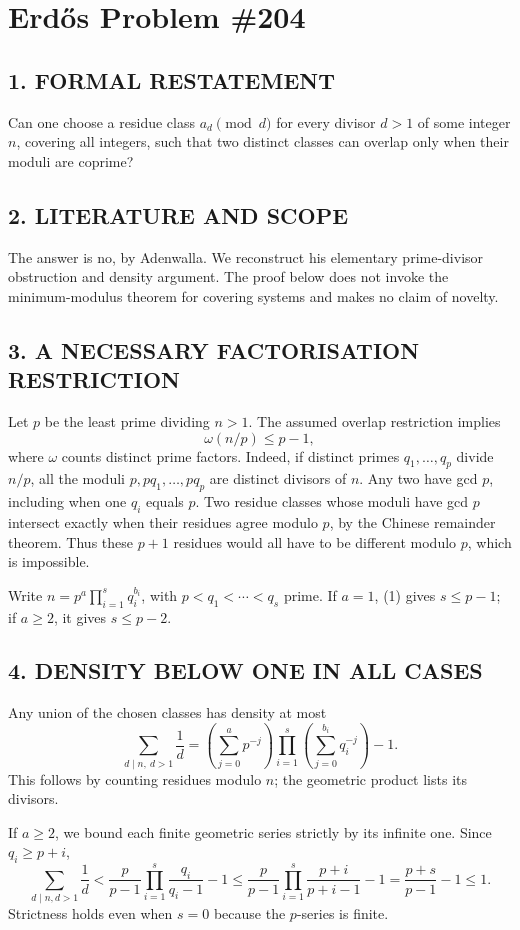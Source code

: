 \section{Erd\H{o}s Problem \#204}
\subsection*{1. FORMAL RESTATEMENT}
Can one choose a residue class $a_d\pmod d$ for every divisor $d>1$ of some integer $n$, covering all integers, such that two distinct classes can overlap only when their moduli are coprime?
\subsection*{2. LITERATURE AND SCOPE}
The answer is no, by Adenwalla. We reconstruct his elementary prime-divisor obstruction and density argument. The proof below does not invoke the minimum-modulus theorem for covering systems and makes no claim of novelty.
\subsection*{3. A NECESSARY FACTORISATION RESTRICTION}
Let $p$ be the least prime dividing $n>1$. The assumed overlap restriction implies
\[
 \omega(n/p)\le p-1,                                      \tag{1}
\]
where $\omega$ counts distinct prime factors. Indeed, if distinct primes $q_1,\ldots,q_p$ divide $n/p$, all the moduli $p,pq_1,\ldots,pq_p$ are distinct divisors of $n$. Any two have gcd $p$, including when one $q_i$ equals $p$. Two residue classes whose moduli have gcd $p$ intersect exactly when their residues agree modulo $p$, by the Chinese remainder theorem. Thus these $p+1$ residues would all have to be different modulo $p$, which is impossible.

Write $n=p^a\prod_{i=1}^s q_i^{b_i}$, with $p<q_1<\cdots<q_s$ prime. If $a=1$, (1) gives $s\le p-1$; if $a\ge2$, it gives $s\le p-2$.
\subsection*{4. DENSITY BELOW ONE IN ALL CASES}
Any union of the chosen classes has density at most
\[
 \sum_{d\mid n,\ d>1}\frac1d
 =\left(\sum_{j=0}^{a}p^{-j}\right)
   \prod_{i=1}^s\left(\sum_{j=0}^{b_i}q_i^{-j}\right)-1.       \tag{2}
\]
This follows by counting residues modulo $n$; the geometric product lists its divisors.

If $a\ge2$, we bound each finite geometric series strictly by its infinite one. Since $q_i\ge p+i$,
\[
 \sum_{d\mid n,d>1}\frac1d
 <\frac p{p-1}\prod_{i=1}^s\frac{q_i}{q_i-1}-1
 \le\frac p{p-1}\prod_{i=1}^s\frac{p+i}{p+i-1}-1
 =\frac{p+s}{p-1}-1\le1.
\]
Strictness holds even when $s=0$ because the $p$-series is finite.

